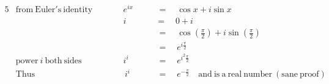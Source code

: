 \begin{alignat*}{5}
&\mathrm{from~Euler's~identity}&&\qquad e^{ix}\quad&&\,=\quad\cos{x}+i\sin{x}\\
&\,&&\qquad i\quad&&=\quad0+i\\
&\,&&\,\quad&&\,=\quad\cos{\left(\frac{\pi}{2}\right)}+i\sin{\left(\frac{\pi}{2}\right)}\\
&\,&&\,\quad&&\,=\quad e^{i\frac{\pi}{2}}\\
&\mathrm{power}~i~\mathrm{both~sides}&&\qquad i^i\quad&&\,=\quad e^{i^2\frac{\pi}{2}}\\
&\mathrm{Thus}&&\,\qquad i^i\quad&&\,=\quad e^{-\frac{\pi}{2}}\quad\mathrm{and~is~a~real~number~(sane~proof)}
\end{alignat*}
